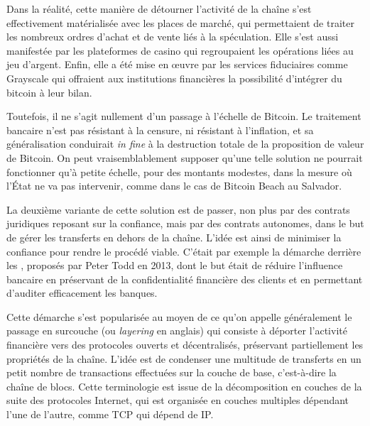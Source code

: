 Dans la réalité, cette manière de détourner l'activité de la chaîne s'est effectivement matérialisée avec les places de marché, qui permettaient de traiter les nombreux ordres d'achat et de vente liés à la spéculation. Elle s'est aussi manifestée par les plateformes de casino qui regroupaient les opérations liées au jeu d'argent. Enfin, elle a été mise en œuvre par les services fiduciaires comme Grayscale qui offraient aux institutions financières la possibilité d'intégrer du bitcoin à leur bilan.

Toutefois, il ne s'agit nullement d'un passage à l'échelle de Bitcoin. Le traitement bancaire n'est pas résistant à la censure, ni résistant à l'inflation, et sa généralisation conduirait \emph{in fine} à la destruction totale de la proposition de valeur de Bitcoin. On peut vraisemblablement supposer qu'une telle solution ne pourrait fonctionner qu'à petite échelle, pour des montants modestes, dans la mesure où l'État ne va pas intervenir, comme dans le cas de Bitcoin Beach au Salvador.

La deuxième variante de cette solution est de passer, non plus par des contrats juridiques reposant sur la confiance, mais par des contrats autonomes, dans le but de gérer les transferts en dehors de la chaîne. L'idée est ainsi de minimiser la confiance pour rendre le procédé viable. C'était par exemple la démarche derrière les , proposés par Peter Todd en 2013, dont le but était de réduire l'influence bancaire en préservant de la confidentialité financière des clients et en permettant d'auditer efficacement les banques.

Cette démarche s'est popularisée au moyen de ce qu'on appelle généralement le passage en surcouche (ou \emph{layering} en anglais) qui consiste à déporter l'activité financière vers des protocoles ouverts et décentralisés, préservant partiellement les propriétés de la chaîne. L'idée est de condenser une multitude de transferts en un petit nombre de transactions effectuées sur la couche de base, c'est-à-dire la chaîne de blocs. Cette terminologie est issue de la décomposition en couches de la suite des protocoles Internet, qui est organisée en couches multiples dépendant l'une de l'autre, comme TCP qui dépend de IP. %

